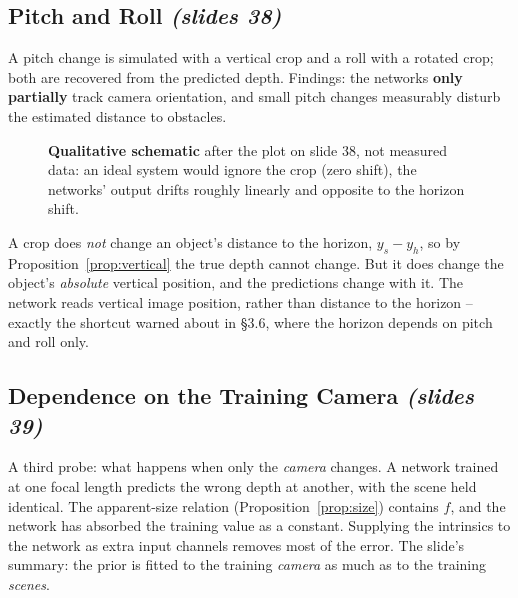 \documentclass[11pt,a4paper]{article}
\numberwithin{equation}{section}
\newcommand{\slides}[1]{\texorpdfstring{\;\emph{(slides #1)}}{ (slides #1)}}
\theoremstyle{plain}
\theoremstyle{definition}
\begin{document}
\subsection{Pitch and Roll \slides{38}}
 
A pitch change is simulated with a vertical crop and a roll with a rotated crop; both are recovered from the predicted depth. Findings: the networks \textbf{only partially} track camera orientation, and small pitch changes measurably disturb the estimated distance to obstacles.
 
\begin{figure}[htbp]
\centering
{}
\caption{\textbf{Qualitative schematic} after the plot on slide 38, not measured data: an ideal system would ignore the crop (zero shift), the networks' output drifts roughly linearly and opposite to the horizon shift.}
\end{figure}
 
\begin{intuition}
A crop does \emph{not} change an object's distance to the horizon, $y_s-y_h$, so by Proposition~\ref{prop:vertical} the true depth cannot change. But it does change the object's \emph{absolute} vertical position, and the predictions change with it. The network reads vertical image position, rather than distance to the horizon -- exactly the shortcut warned about in \S3.6, where the horizon depends on pitch and roll only.
\end{intuition}
 
\subsection{Dependence on the Training Camera \slides{39}}
 
A third probe: what happens when only the \emph{camera} changes. A network trained at one focal length predicts the wrong depth at another, with the scene held identical. The apparent-size relation (Proposition~\ref{prop:size}) contains $f$, and the network has absorbed the training value as a constant. Supplying the intrinsics to the network as extra input channels removes most of the error. The slide's summary: the prior is fitted to the training \emph{camera} as much as to the training \emph{scenes}.
 
\end{document}
